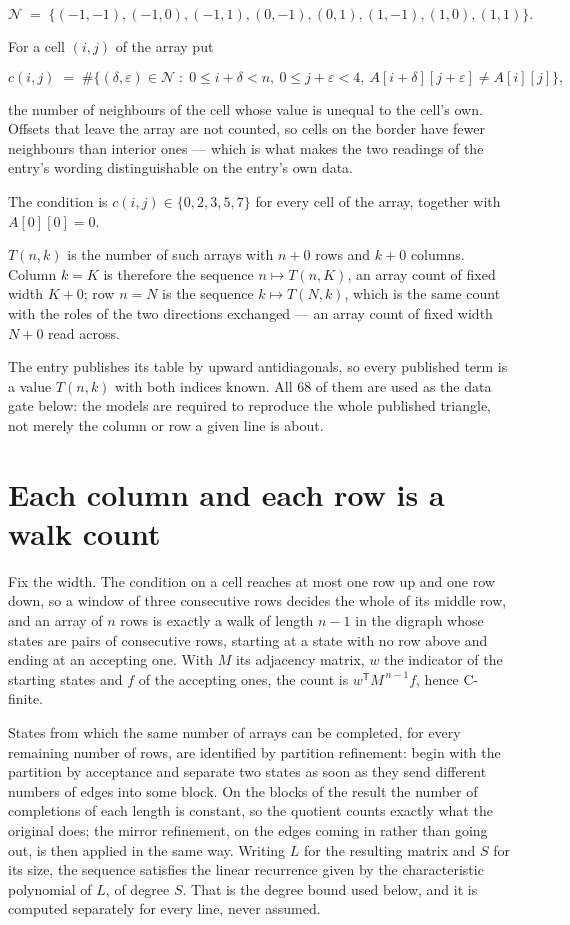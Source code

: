 \documentclass[11pt]{article}
\theoremstyle{definition}
\begin{document}
\[\mathcal{N} \;=\; \{(-1,-1), (-1,0), (-1,1), (0,-1), (0,1), (1,-1), (1,0), (1,1)\}.\]

For a cell $(i,j)$ of the array put

\[c(i,j) \;=\; \#\bigl\{(\delta,\varepsilon)\in\mathcal{N} \;:\; 0\le i+\delta<n,\ 0\le j+\varepsilon<4,\ A[i+\delta][j+\varepsilon] \neq A[i][j]\bigr\},\]

the number of neighbours of the cell whose value is unequal to the cell's own. Offsets that leave the array are not counted, so cells on the border have fewer neighbours than interior ones --- which is what makes the two readings of the entry's wording distinguishable on the entry's own data.

The condition is $c(i,j) \in \{0, 2, 3, 5, 7\}$ for every cell of the array, together with $A[0][0]=0$.

$T(n,k)$ is the number of such arrays with $n + 0$ rows and $k + 0$ columns. Column $k = K$ is therefore the sequence $n \mapsto T(n,K)$, an array count of fixed width $K + 0$; row $n = N$ is the sequence $k \mapsto T(N,k)$, which is the same count with the roles of the two directions exchanged --- an array count of fixed width $N + 0$ read across.

The entry publishes its table by upward antidiagonals, so every published term is a value $T(n,k)$ with both indices known. All 68 of them are used as the data gate below: the models are required to reproduce the whole published triangle, not merely the column or row a given line is about.

\section{Each column and each row is a walk count}

Fix the width. The condition on a cell reaches at most one row up and one row down, so a window of three consecutive rows decides the whole of its middle row, and an array of $n$ rows is exactly a walk of length $n-1$ in the digraph whose states are pairs of consecutive rows, starting at a state with no row above and ending at an accepting one. With $M$ its adjacency matrix, $w$ the indicator of the starting states and $f$ of the accepting ones, the count is $w^{\mathsf T}M^{\,n-1}f$, hence C-finite.

States from which the same number of arrays can be completed, for every remaining number of rows, are identified by partition refinement: begin with the partition by acceptance and separate two states as soon as they send different numbers of edges into some block. On the blocks of the result the number of completions of each length is constant, so the quotient counts exactly what the original does; the mirror refinement, on the edges coming in rather than going out, is then applied in the same way. Writing $L$ for the resulting matrix and $S$ for its size, the sequence satisfies the linear recurrence given by the characteristic polynomial of $L$, of degree $S$. That is the degree bound used below, and it is computed separately for every line, never assumed.
\end{document}
